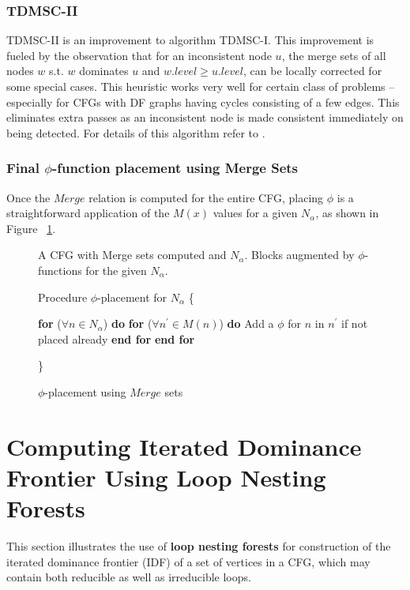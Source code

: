 \subsubsection{TDMSC-II}

TDMSC-II is an improvement to algorithm TDMSC-I. This improvement is fueled by the observation that for an inconsistent node $u$, the merge sets of all nodes $w$ s.t. $w$ dominates $u$ and $w.level \geq u.level$,
can be locally corrected for some special cases. This
heuristic works very well for certain class of problems -- especially for CFGs with DF graphs having cycles consisting of a few edges. This eliminates extra passes as an inconsistent node is made consistent immediately on being detected. For details of this algorithm refer to \cite{}.

\subsubsection { Final $\phi$-function placement using Merge Sets }
Once the $Merge$ relation is computed for the entire CFG, placing $\phi$ is a straightforward application of the $M(x)$ values for a given $N_{\alpha}$, as shown in Figure ~\ref{F:phip}.
\begin{figure}[!ht]
\centering
\begin{minipage}[t]{5in}
 A CFG with Merge sets computed and $N_{\alpha}$.
 Blocks augmented by $\phi$-functions for the given $N_{\alpha}$.

\setcounter{linectr}{0}

Procedure $\phi$-placement for $N_{\alpha}$
\{
\begin{code}
 {\bf for} ($\forall n \in N_{\alpha}$) {\bf do}
   {\bf for} ($\forall n^{'} \in M(n)$) {\bf do}
       Add a $\phi$ for $n$ in $n^{'}$ if not placed already
   {\bf end for}
 {\bf end for}
\end{code}
\}
\end{minipage}
\caption{$\phi$-placement using $Merge$ sets}
\label{F:phip}
\end{figure} 

\section{Computing Iterated Dominance Frontier Using Loop Nesting Forests}
    This section illustrates the use of {\bf loop nesting forests} for construction of the iterated
    dominance frontier (IDF) of a set of vertices in a CFG, which may contain both reducible as well as
    irreducible loops.


